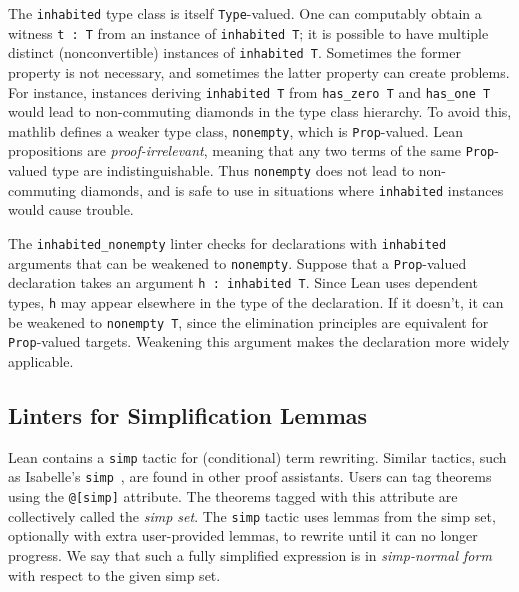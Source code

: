 \documentclass[runningheads]{llncs}
\newcommand{\mathlib}{\textsf{mathlib}\xspace}
\newcommand{\lean}[1]{\lstinline[language=lean]{#1}}
\begin{document}
The \lean{inhabited} type class is itself \lean{Type}-valued.
One can computably obtain a witness \lean{t : T}
from an instance of \lean{inhabited T};
it is possible to have multiple distinct (nonconvertible) instances of \lean{inhabited T}.
Sometimes the former property is not necessary,
and sometimes the latter property can create problems.
For instance, instances deriving \lean{inhabited T}
from \lean{has_zero T} and \lean{has_one T}
would lead to non-commuting diamonds
in the type class hierarchy.
To avoid this, \mathlib defines a weaker type class,
\lean{nonempty}, which is \lean{Prop}-valued.
Lean propositions are \emph{proof-irrelevant},
meaning that any two terms of the same \lean{Prop}-valued type are indistinguishable.
Thus \lean{nonempty} does not lead to non-commuting diamonds,
and is safe to use in situations where \lean{inhabited} instances would cause trouble.

The \lean{inhabited_nonempty} linter checks for declarations
with \lean{inhabited} arguments that can be weakened to \lean{nonempty}.
Suppose that a \lean{Prop}-valued declaration
takes an argument \lean{h : inhabited T}.
Since Lean uses dependent types,
\lean{h} may appear elsewhere in the type of the declaration.
If it doesn't,
it can be weakened to \lean{nonempty T},
since the elimination principles are equivalent for \lean{Prop}-valued targets.
Weakening this argument makes the declaration more widely applicable.


\subsection{Linters for Simplification Lemmas}
\label{subsection:simp-linters}

Lean contains a \lean{simp} tactic for (conditional) term rewriting.
Similar tactics, such as Isabelle's \texttt{simp}~\cite{Nipkow02},
are found in other proof assistants.
Users can tag theorems using the \lean{@[simp]} attribute.
The theorems tagged with this attribute
are collectively called the \emph{simp set}.
The \lean{simp} tactic uses lemmas from the simp set,
optionally with extra user-provided lemmas,
to rewrite until it can no longer progress.
We say that such a fully simplified expression
is in \emph{simp-normal form} with respect to the given simp set.
\end{document}
